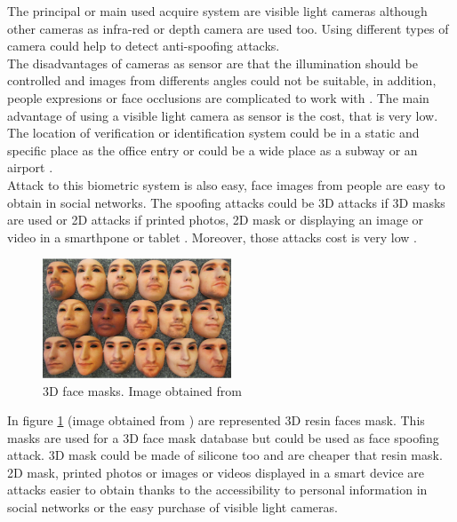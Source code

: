 The principal or main used acquire system are visible light cameras although other cameras as infra-red  or depth camera are used too. Using different types of camera could help to detect anti-spoofing attacks.\\

The disadvantages of cameras as sensor are that the illumination should be controlled and images from differents angles could not be suitable, in addition, people expresions or face occlusions are complicated to work with \cite{survey2,2d_3d_face}. The main advantage of using a visible light camera as sensor is the cost, that is very low. \\

The location of verification or identification system could be in a static and specific place as the office entry or could be a wide place as a subway or an airport \cite{survey2}.\\

Attack to this biometric system is also easy, face images from people are easy to obtain in social networks. The spoofing attacks could be 3D attacks if 3D masks are used or 2D attacks if printed photos, 2D mask or displaying an image or video in a smarthpone or tablet \cite{2d_3d_face}. Moreover, those attacks cost is very low \cite{distorsion}.\\ 

\begin{figure}[htb]
\centering
\includegraphics[width=0.5\textwidth]{images_miscelaneus/fig_masks.png}
\caption{3D face masks. Image obtained from \cite{3dmask}} \label{fig:3dMasks}
\end{figure}

In figure \ref{fig:3dMasks} (image obtained from \cite{3dmask}) are represented 3D resin faces mask. This masks are used for a 3D face mask database but could be used as face spoofing attack. 3D mask could be made of silicone too and are cheaper that resin mask.\\

2D mask, printed photos or images or videos displayed in a smart device are attacks easier to obtain thanks to the accessibility to personal information in social networks or the easy purchase of visible light cameras.\\

